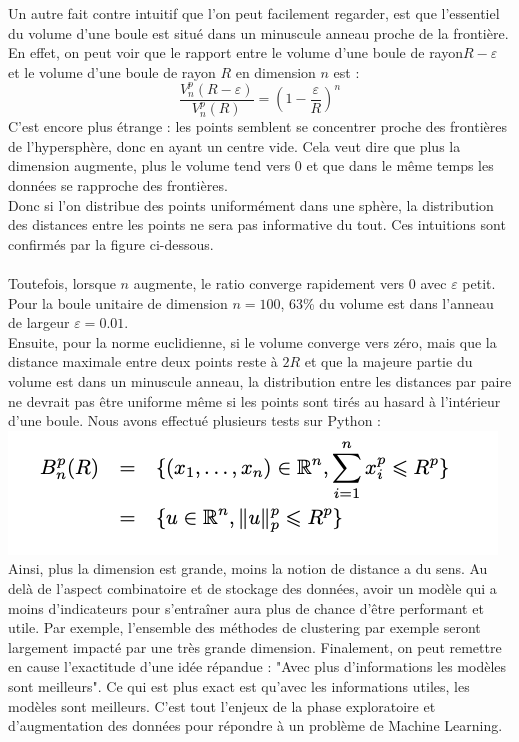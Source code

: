 Un autre fait contre intuitif que l'on peut facilement regarder, est que l'essentiel du volume d'une boule est situé dans un minuscule anneau proche de la frontière. En effet, on peut voir que le rapport entre le volume d'une boule de rayon$R-\varepsilon$ et le volume d'une boule de rayon $R$ en dimension $n$ est :
\begin{equation*} \frac{V_n^p(R - \varepsilon)}{V_n^p(R)} = \left(1- \frac{\varepsilon}{R}\right)^n \end{equation*}
C’est encore plus étrange : les points semblent se concentrer proche des frontières de l’hypersphère, donc en ayant un centre vide. Cela veut dire que plus la dimension augmente, plus le volume tend vers 0 et que dans le même temps les données se rapproche des frontières.
\\
Donc si l’on distribue des points uniformément dans une sphère, la distribution des distances entre les points ne sera pas informative du tout. Ces intuitions sont confirmés par la figure ci-dessous.
\\
\\
Toutefois, lorsque $n$ augmente, le ratio converge rapidement vers 0 avec $\varepsilon$ petit. Pour la boule unitaire de dimension $n=100$, 63\% du volume est dans l'anneau de largeur $\varepsilon = 0.01$.
\\
Ensuite, pour la norme euclidienne, si le volume converge vers zéro, mais que la distance maximale entre deux points reste à $2R$ et que la majeure partie du volume est dans un minuscule anneau, la distribution entre les distances par paire ne devrait pas être uniforme même si les points sont tirés au hasard à l'intérieur d'une boule. Nous avons effectué plusieurs tests sur Python :
\\
\includegraphics[width=\linewidth]{./img/notions_math/courbe_2}
\\
Ainsi, plus la dimension est grande, moins la notion de distance a du sens. Au delà de l’aspect combinatoire et de stockage des données, avoir un modèle qui a moins d’indicateurs pour s’entraîner aura plus de chance d’être performant et utile. Par exemple, l’ensemble des méthodes de clustering par exemple seront largement impacté par une très grande dimension. Finalement, on peut remettre en cause l’exactitude d’une idée répandue : "Avec plus d’informations les modèles sont meilleurs". Ce qui est plus exact est qu’avec les informations utiles, les modèles sont meilleurs. C’est tout l’enjeux de la phase exploratoire et d’augmentation des données pour répondre à un problème de Machine Learning.
